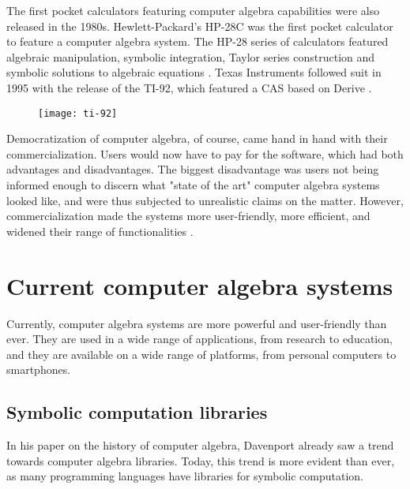 The first pocket calculators featuring computer algebra capabilities were also released in the 1980s. Hewlett-Packard's HP-28C was the first \parencite{nelson-hp-calculator-first} pocket calculator to feature a computer algebra system. The HP-28 series of calculators featured algebraic manipulation, symbolic integration, Taylor series construction and symbolic solutions to algebraic equations \parencite{hp-28s-manual}. Texas Instruments followed suit in 1995 with the release of the TI-92, which featured a CAS based on Derive \parencite{ti-92-guidebook}.

\begin{figure}[htb]
      {\texttt{[image: ti-92]}}
\end{figure}  

Democratization of computer algebra, of course, came hand in hand with their commercialization. Users would now have to pay for the software, which had both advantages and disadvantages. The biggest disadvantage was users not being informed enough to discern what "state of the art" computer algebra systems looked like, and were thus subjected to unrealistic claims on the matter. However, commercialization made the systems more user-friendly, more efficient, and widened their range of functionalities \parencite{geddes1992algorithms}.

\section{Current computer algebra systems}\label{sec:current-computer-algebra-systems}

Currently, computer algebra systems are more powerful and user-friendly than ever. They are used in a wide range of applications, from research to education, and they are available on a wide range of platforms, from personal computers to smartphones.

\subsection{Symbolic computation libraries}\label{subsec:symbolic-computation-libraries}

In his paper on the history of computer algebra, Davenport \parencite*{davenport1994computer} already saw a trend towards computer algebra libraries. Today, this trend is more evident than ever, as many programming languages have libraries for symbolic computation.

